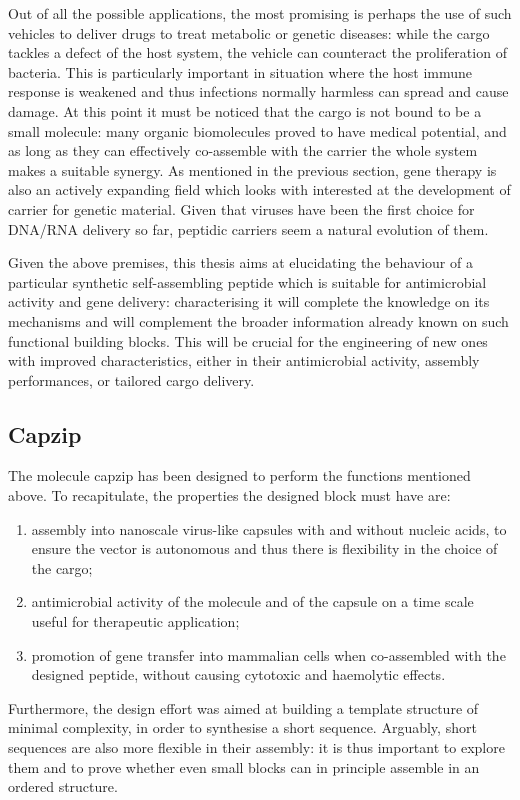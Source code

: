Out of all the possible applications, the most promising is perhaps the use of such vehicles to deliver drugs to treat metabolic or genetic diseases: while the cargo tackles a defect of the host system, the vehicle can counteract the proliferation of bacteria. This is particularly important in situation where the host immune response is weakened and thus infections normally harmless can spread and cause damage.
%
At this point it must be noticed that the cargo is not bound to be a small molecule: many organic biomolecules proved to have medical potential, and as long as they can effectively co-assemble with the carrier the whole system makes a suitable synergy. As mentioned in the previous section, gene therapy is also an actively expanding field which looks with interested at the development of carrier for genetic material. Given that viruses have been the first choice for DNA/RNA delivery so far, peptidic carriers seem a natural evolution of them.

\bigskip
Given the above premises, this thesis aims at elucidating the behaviour of a particular synthetic self-assembling peptide which is suitable for antimicrobial activity and gene delivery: characterising it will complete the knowledge on its mechanisms and will complement the broader information already known on such functional building blocks. This will be crucial for the engineering of new ones with improved characteristics, either in their antimicrobial activity, assembly performances, or tailored cargo delivery.


\subsection{Capzip}
The molecule capzip has been designed to perform the functions mentioned above. To recapitulate, the properties the designed block must have are:
\begin{enumerate}
\item assembly into nanoscale virus-like capsules with and without nucleic acids, to ensure the vector is autonomous and thus there is flexibility in the choice of the cargo;
\item antimicrobial activity of the molecule and of the capsule on a time scale useful for therapeutic application;
\item promotion of gene transfer into mammalian cells when co-assembled with the designed peptide, without causing cytotoxic and haemolytic effects.
\end{enumerate}
%
Furthermore, the design effort was aimed at building a template structure of minimal complexity, in order to synthesise a short sequence. Arguably, short sequences are also more flexible in their assembly: it is thus important to explore them and to prove whether even small blocks can in principle assemble in an ordered structure.

